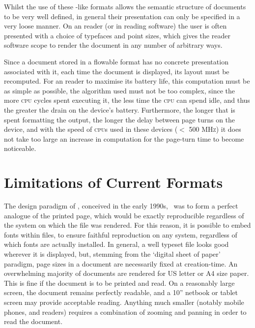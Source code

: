 Whilst the use of these \html{}-like formats allows the semantic structure of documents to be very well defined, in general their presentation can only be specified in a very loose manner. On an \ebook{} reader (or in \ebook{} reading software) the user is often presented with a choice of typefaces and point sizes, which gives the reader software scope to render the document in any number of arbitrary ways.

Since a document stored in a flowable format has no concrete presentation associated with it, each time the document is displayed, its layout must be recomputed. For an \ebook{} reader to maximise its battery life, this computation must be as simple as possible, \ie{} the algorithm used must not be too complex, since the more \textsc{cpu} cycles spent executing it, the less time the \textsc{cpu} can spend idle, and thus the greater the drain on the device's battery. Furthermore, the longer that is spent formatting the output, the longer the delay between page turns on the device, and with the speed of \textsc{cpu}s used in these devices ($<$ 500 \textsc{MHz}) it does not take too large an increase in computation for the page-turn time to become noticeable.



\section{Limitations of Current Formats}

The design paradigm of \pdf{}, conceived in the early 1990s,~\cite{Warnock1991} was to form a perfect analogue of the printed page, which would be exactly reproducible regardless of the system on which the file was rendered. For this reason, it is possible to embed fonts within \pdf{} files, to ensure faithful reproduction on any system, regardless of which fonts are actually installed. In general, a well typeset \pdf{} file looks good wherever it is displayed, but, stemming from the `digital sheet of paper' paradigm, page sizes in a \pdf{} document are necessarily fixed at creation-time. An overwhelming majority of \pdf{} documents are rendered for  US letter or A4 size paper. This is fine if the document is to be printed and read. On a reasonably large screen, the document remains perfectly readable, and a 10'' netbook or tablet screen may provide acceptable reading. Anything much smaller (notably mobile phones, and \ebook{} readers) requires a combination of zooming and panning  in order to read the document.

